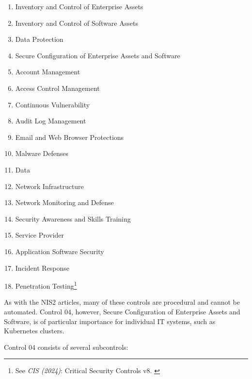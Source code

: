 \begin{enumerate}
    \item Inventory and Control of Enterprise Assets
    \item Inventory and Control of Software Assets
    \item Data Protection
    \item Secure Configuration of Enterprise Assets and Software
    \item Account Management
    \item Access Control Management
    \item Continuous Vulnerability
    \item Audit Log Management
    \item Email and Web Browser Protections
    \item Malware Defenses
    \item Data
    \item Network Infrastructure
    \item Network Monitoring and Defense
    \item Security Awareness and Skills Training
    \item Service Provider
    \item Application Software Security
    \item Incident Response
    \item Penetration Testing\footnote{See \textit{CIS (2024)}: Critical Security Controls v8. \cite{cisControls}}
\end{enumerate}

As with the NIS2 articles, many of these controls are procedural and cannot be automated. Control 04, however, Secure Configuration of Enterprise Assets and Software, is of particular importance for individual IT systems, such as Kubernetes clusters.

Control 04 consists of several subcontrols:

